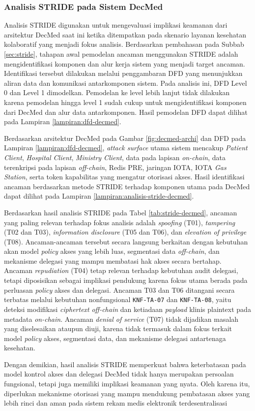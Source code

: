 \subsubsection{Analisis STRIDE pada Sistem DecMed}
\label{subsec:analisis-stride-decmed}

Analisis STRIDE digunakan untuk mengevaluasi implikasi keamanan dari arsitektur DecMed saat ini ketika ditempatkan pada skenario layanan kesehatan kolaboratif yang menjadi fokus analisis. Berdasarkan pembahasan pada Subbab \ref{sec:stride}, tahapan awal pemodelan ancaman menggunakan STRIDE adalah mengidentifikasi komponen dan alur kerja sistem yang menjadi target ancaman. Identifikasi tersebut dilakukan melalui penggambaran DFD yang menunjukkan aliran data dan komunikasi antarkomponen sistem. Pada analisis ini, DFD Level 0 dan Level 1 dimodelkan. Pemodelan ke level lebih lanjut tidak dilakukan karena pemodelan hingga level 1 sudah cukup untuk mengidentifikasi komponen dari DecMed dan alur data antarkomponen. Hasil pemodelan DFD dapat dilihat pada Lampiran \ref{lampiran:dfd-decmed}.

Berdasarkan arsitektur DecMed pada Gambar \ref{fig:decmed-archi} dan DFD pada Lampiran \ref{lampiran:dfd-decmed}, \textit{attack surface} utama sistem mencakup \textit{Patient Client}, \textit{Hospital Client}, \textit{Ministry Client}, data pada lapisan \textit{on-chain}, data terenkripsi pada lapisan \textit{off-chain}, Redis PRE, jaringan IOTA, IOTA \textit{Gas Station}, serta token kapabilitas yang mengatur otorisasi akses. Hasil identifikasi ancaman berdasarkan metode STRIDE terhadap komponen utama pada DecMed dapat dilihat pada Lampiran \ref{lampiran:analisis-stride-decmed}.

Berdasarkan hasil analisis STRIDE pada Tabel \ref{tab:stride-decmed}, ancaman yang paling relevan terhadap fokus analisis adalah \textit{spoofing} (T01), \textit{tampering} (T02 dan T03), \textit{information disclosure} (T05 dan T06), dan \textit{elevation of privilege} (T08). Ancaman-ancaman tersebut secara langsung berkaitan dengan kebutuhan akan model \textit{policy} akses yang lebih luas, segmentasi data \textit{off-chain}, dan mekanisme delegasi yang mampu membatasi hak akses secara bertahap. Ancaman \textit{repudiation} (T04) tetap relevan terhadap kebutuhan audit delegasi, tetapi diposisikan sebagai implikasi pendukung karena fokus utama berada pada perluasan \textit{policy} akses dan delegasi. Ancaman T03 dan T06 ditangani secara terbatas melalui kebutuhan nonfungsional \texttt{KNF-TA-07} dan \texttt{KNF-TA-08}, yaitu deteksi modifikasi \textit{ciphertext} \textit{off-chain} dan ketiadaan \textit{payload} klinis plaintext pada metadata \textit{on-chain}. Ancaman \textit{denial of service} (T07) tidak dijadikan masalah yang diselesaikan ataupun diuji, karena tidak termasuk dalam fokus terkait model \textit{policy} akses, segmentasi data, dan mekanisme delegasi antartenaga kesehatan.

Dengan demikian, hasil analisis STRIDE memperkuat bahwa keterbatasan pada model kontrol akses dan delegasi DecMed tidak hanya merupakan persoalan fungsional, tetapi juga memiliki implikasi keamanan yang nyata. Oleh karena itu, diperlukan mekanisme otorisasi yang mampu mendukung pembatasan akses yang lebih rinci dan aman pada sistem rekam medis elektronik terdesentralisasi